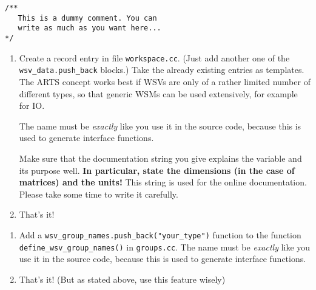 \begin{verbatim}
/**
   This is a dummy comment. You can
   write as much as you want here... 
*/
\end{verbatim}




 \label{sec:development:extending}

\begin{enumerate}
\item Create a record entry in file \verb|workspace.cc|. (Just add
  another one of the \verb|wsv_data.push_back| blocks.) Take the
  already existing entries as templates. The ARTS concept works best
  if WSVs are only of a rather limited number of different types, so
  that generic WSMs can be used extensively, for example for IO.
      
  The name must be \emph{exactly} like you use it in the source code,
  because this is used to generate interface functions.
  
  Make sure that the documentation string you give explains the
  variable and its purpose well. \textbf{In particular, state the
    dimensions (in the case of matrices) and the units!} This string
  is used for the online documentation. Please take some time to write
  it carefully.

\item That's it!
\end{enumerate}


\begin{enumerate}
\item Add a \verb|wsv_group_names.push_back("your_type")| function to
  the function \verb|define_wsv_group_names()| in \verb|groups.cc|. The
  name must be \emph{exactly} like you use it in the source code,
  because this is used to generate interface functions.
\item That's it! (But as stated above, use this feature wisely)
\end{enumerate}



